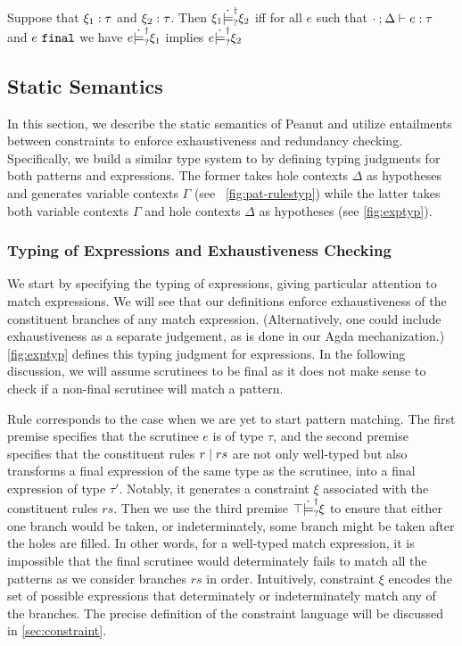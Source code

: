 \begin{definition}
  \label{definition:nn-entailment}
  Suppose that $\xi_1 : \tau$ and $\xi_2 : \tau$. Then $\xi_1 \dot{\models}_{?}^{\dag} \xi_2$ iff for all $e$ such that $\cdot \mathbin{;} \Delta \vdash e : \tau$ and $e ~\mathtt{final}$ we have $e \dot{\models}_{?}^{\dag} \xi_1$ implies $e \dot{\models}_{?}^{\dag} \xi_2$ 
\end{definition}


\subsection{Static Semantics}\label{sec:statics}



In this section, we describe the static semantics of Peanut and utilize entailments between constraints to enforce exhaustiveness and redundancy checking.
  Specifically, we build a similar type system to
\cite{DBLP:journals/pacmpl/OmarVCH19} by defining typing judgments for both
patterns and expressions. The former takes hole contexts $\Delta$ as hypotheses and generates variable contexts $\Gamma$ (see \figurename~\ref{fig:pat-rulestyp}) while the latter 
takes both variable contexts $\Gamma$ and hole contexts $\Delta$ as hypotheses (see
\autoref{fig:exptyp}).

\subsubsection{Typing of Expressions and Exhaustiveness Checking} \label{sec:exptyp}

We start by specifying the typing of expressions, giving particular attention to match expressions. We will see that our definitions enforce exhaustiveness of the constituent branches of any match expression. (Alternatively, one could include exhaustiveness as a separate judgement, as is done in our Agda mechanization.) \autoref{fig:exptyp} defines this typing judgment for expressions. 
In the following discussion, we will assume scrutinees to be final as 
it does not make sense to check if a non-final scrutinee will match a pattern.

Rule \TMatchZPre corresponds to the case when we are yet to start pattern
matching. The first premise specifies that the scrutinee $e$ is of type $\tau$,
and the second premise specifies that the constituent rules $r \mid rs$ are not only
well-typed but also transforms a final expression of the same type as the
scrutinee, into a final expression of type $\tau'$. Notably, it generates a
constraint $\xi$ associated with the constituent rules $rs$. Then we use the
third premise $\top \dot{\models}_{?}^{\dag} \xi$ to ensure that either 
one branch would be taken, or indeterminately, some branch might be taken after the holes are filled. 
In other words, for a well-typed match expression,
it is impossible that the final scrutinee would determinately fails to match all the patterns as we consider branches $rs$ in order.
Intuitively, constraint $\xi$ encodes the set of possible expressions that determinately or indeterminately match any of the branches. 
The precise definition of the constraint language will be discussed in  
\autoref{sec:constraint}. 

